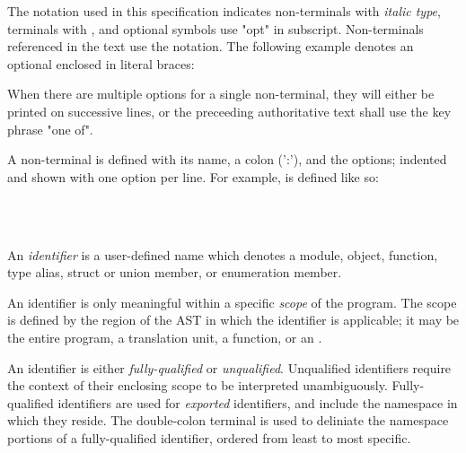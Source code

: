 


\specsubitem
The notation used in this specification indicates non-terminals with
\textit{italic type}, terminals with , and optional
symbols use "opt" in subscript. Non-terminals referenced in the text use the
 notation. The following example denotes an optional
 enclosed in literal braces:

\begin{grammar}
\terminal{\{}  \terminal{\}}
\end{grammar}

\specsubitem
When there are multiple options for a single non-terminal, they will either be
printed on successive lines, or the preceeding authoritative text shall use the
key phrase "one of".

\specsubitem
A non-terminal is defined with its name, a colon (':'), and the options;
indented and shown with one option per line. For example,
 is defined like so:

\begin{grammar}
\\
 \terminal{,}\\
 \terminal{,} 
\end{grammar}


\specsubitem
An \textit{identifier} is a user-defined name which denotes a module, object,
function, type alias, struct or union member, or enumeration member.

\specsubitem
An identifier is only meaningful within a specific \textit{scope} of the
program. The scope is defined by the region of the AST in which the identifier
is applicable; it may be the entire program, a translation unit, a function, or
an .

\specsubitem
An identifier is either \textit{fully-qualified} or \textit{unqualified}.
Unqualified identifiers require the context of their enclosing scope to be
interpreted unambiguously. Fully-qualified identifiers are used for
\textit{exported} identifiers, and include the namespace in which they reside.
The double-colon terminal \terminal{::} is used to deliniate the namespace
portions of a fully-qualified identifier, ordered from least to most specific.

